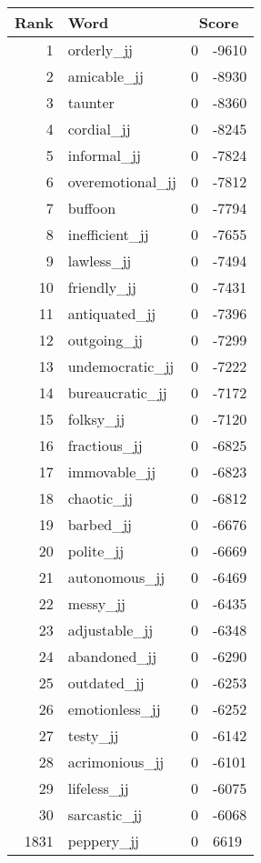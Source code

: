 \begin{longtable}[!htbp]{| rlr@{.}l |}
    \hline
    \textbf{Rank} & \textbf{Word} & \multicolumn{2}{c|}{\textbf{Score}} \\
    \hline
    \endhead
    1 & orderly\_jj & 0 & -9610 \\
    2 & amicable\_jj & 0 & -8930 \\
    3 & taunter & 0 & -8360 \\
    4 & cordial\_jj & 0 & -8245 \\
    5 & informal\_jj & 0 & -7824 \\
    6 & overemotional\_jj & 0 & -7812 \\
    7 & buffoon & 0 & -7794 \\
    8 & inefficient\_jj & 0 & -7655 \\
    9 & lawless\_jj & 0 & -7494 \\
    10 & friendly\_jj & 0 & -7431 \\
    11 & antiquated\_jj & 0 & -7396 \\
    12 & outgoing\_jj & 0 & -7299 \\
    13 & undemocratic\_jj & 0 & -7222 \\
    14 & bureaucratic\_jj & 0 & -7172 \\
    15 & folksy\_jj & 0 & -7120 \\
    16 & fractious\_jj & 0 & -6825 \\
    17 & immovable\_jj & 0 & -6823 \\
    18 & chaotic\_jj & 0 & -6812 \\
    19 & barbed\_jj & 0 & -6676 \\
    20 & polite\_jj & 0 & -6669 \\
    21 & autonomous\_jj & 0 & -6469 \\
    22 & messy\_jj & 0 & -6435 \\
    23 & adjustable\_jj & 0 & -6348 \\
    24 & abandoned\_jj & 0 & -6290 \\
    25 & outdated\_jj & 0 & -6253 \\
    26 & emotionless\_jj & 0 & -6252 \\
    27 & testy\_jj & 0 & -6142 \\
    28 & acrimonious\_jj & 0 & -6101 \\
    29 & lifeless\_jj & 0 & -6075 \\
    30 & sarcastic\_jj & 0 & -6068 \\
    1831 & peppery\_jj & 0 & 6619 \\

\end{longtable}
